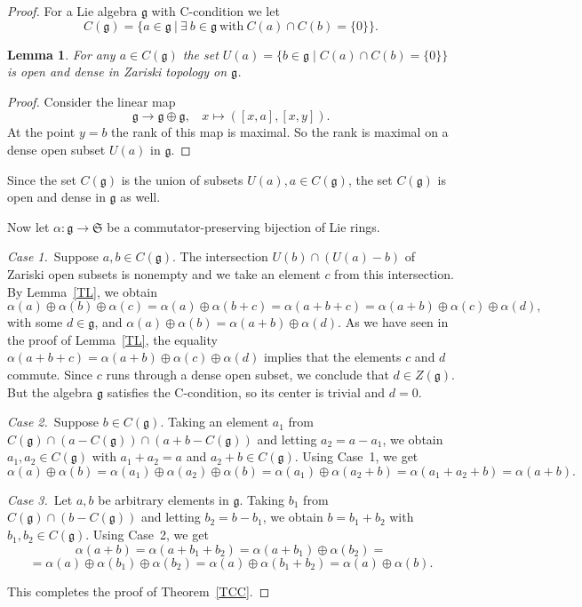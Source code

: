 \documentclass[a4paper,draft,reqno,12pt]{amsart}
\newtheorem{lemma}{Lemma}
\theoremstyle{definition}
\theoremstyle{remark}
\def\SSS{\mathfrak{S}}
\def\ggg{\mathfrak{g}}
\begin{document}
\begin{proof} 
For a Lie algebra $\mathfrak{g}$ with C-condition we let
$$
C(\mathfrak{g})=\{a\in\mathfrak{g}\ | \  \exists \ b\in\mathfrak{g} \ \text{with} \ C(a)\cap C(b)=\{0\}\}.
$$

\begin{lemma}
For any $a\in C(\mathfrak{g})$ the set $U(a)=\{b\in\mathfrak{g} \mid C(a)\cap C(b)=\{0\} \}$ is open and dense in Zariski topology on $\mathfrak{g}$.
\end{lemma}
%
\begin{proof}
Consider the linear map
$$
\mathfrak{g}\to\mathfrak{g}\oplus\mathfrak{g}, \ \ \ \  x\mapsto ([x,a], [x,y]). 
$$
At the point $y=b$ the rank of this map is maximal. So the rank is maximal on a dense open subset $U(a)$ in $\mathfrak{g}$.
\end{proof}

Since the set $C(\ggg)$ is the union of subsets $U(a), a\in C(\ggg)$, the set $C(\ggg)$ is open and dense in $\ggg$ as well. 

\smallskip

Now let $\alpha\colon\ggg\to\SSS$ be a commutator-preserving bijection of Lie rings.

\bigskip

{\it Case 1.}\ Suppose $a, b\in C(\mathfrak{g})$. The intersection $U(b)\cap(U(a)-b)$ of Zariski open subsets is nonempty and we take an element $c$ from this intersection.
By Lemma~\ref{TL}, we obtain
$$
\alpha(a)\oplus\alpha(b)\oplus\alpha(c)=\alpha(a)\oplus\alpha(b+c)=\alpha(a+b+c)=\alpha(a+b)\oplus\alpha(c)\oplus\alpha(d),
$$
with some $d\in\ggg$, and $\alpha(a)\oplus\alpha(b)=\alpha(a+b)\oplus\alpha(d)$. As we have seen in the proof of Lemma~\ref{TL},
the equality $\alpha(a+b+c)=\alpha(a+b)\oplus\alpha(c)\oplus\alpha(d)$ implies that the elements $c$ and $d$ commute. 
Since $c$ runs through a dense open subset, we conclude that $d\in Z(\ggg)$. But the algebra $\ggg$
satisfies the C-condition, so its center is trivial and $d=0$. 

\bigskip

{\it Case 2.}\ Suppose $b\in C(\mathfrak{g})$. Taking an element $a_1$ from $C(\mathfrak{g})\cap(a-C(\mathfrak{g}))\cap(a+b-C(\mathfrak{g}))$
and letting $a_2=a-a_1$, we obtain $a_1, a_2\in C(\mathfrak{g})$ with $a_1+a_2=a$ and $a_2+b\in C(\mathfrak{g})$. Using Case~1, we get
$$
\alpha(a)\oplus\alpha(b)=\alpha(a_1)\oplus\alpha(a_2)\oplus\alpha(b)=\alpha(a_1)\oplus\alpha(a_2+b)=\alpha(a_1+a_2+b)=\alpha(a+b).
$$

\bigskip

{\it Case 3.}\  Let $a,b$ be arbitrary elements in $\ggg$. Taking $b_1$ from $C(\ggg)\cap(b-C(\ggg))$ and letting $b_2=b-b_1$, we obtain
$b=b_1+b_2$ with $b_1,b_2\in C(\mathfrak{g})$. Using Case~2, we get
$$
\alpha(a+b)=\alpha(a+b_1+b_2)=\alpha(a+b_1)\oplus\alpha(b_2)=
$$
$$
=\alpha(a)\oplus\alpha(b_1)\oplus\alpha(b_2)=\alpha(a)\oplus\alpha(b_1+b_2)=\alpha(a)\oplus\alpha(b).
$$
\smallskip

This completes the proof of Theorem~\ref{TCC}.
\end{proof} 
\end{document}
